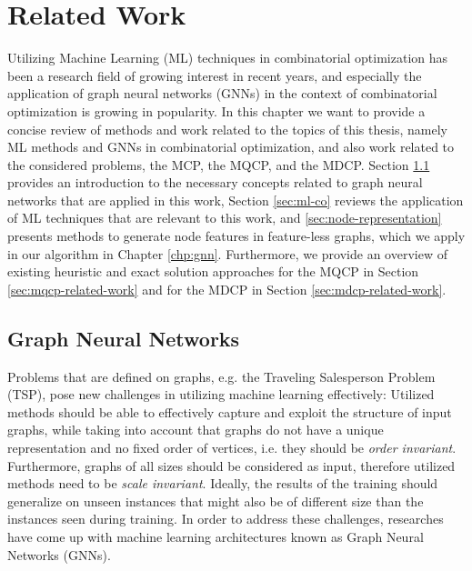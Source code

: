 \documentclass[draft,final]{vutinfth} %
\newtheorem{definition}{Definition}[section]
\begin{document}




\chapter{Related Work}\label{chp:related-work}

Utilizing Machine Learning (ML) techniques in combinatorial optimization has been a research field of growing interest in recent years, and especially the application of graph neural networks (GNNs) in the context of combinatorial optimization is growing in popularity. 
In this chapter we want to provide a concise review of methods and work related to the topics of this thesis, namely ML methods and GNNs in combinatorial optimization, and also work related to the considered problems, the MCP, the MQCP, and the MDCP. Section \ref{sec:gnns} provides an introduction to the necessary concepts related to graph neural networks that are applied in this work, Section \ref{sec:ml-co} reviews the application of ML techniques that are relevant to this work, and \ref{sec:node-representation} presents methods to generate node features in feature-less graphs, which we apply in our algorithm in Chapter \ref{chp:gnn}. Furthermore, we provide an overview of existing heuristic and exact solution approaches for the MQCP in Section \ref{sec:mqcp-related-work} and for the MDCP in Section \ref{sec:mdcp-related-work}. 

\section{Graph Neural Networks}\label{sec:gnns}
Problems that are defined on graphs, e.g. the Traveling Salesperson Problem (TSP), pose new challenges in utilizing machine learning effectively: Utilized methods should be able to effectively capture and exploit the structure of input graphs, while taking into account that graphs do not have a unique representation and no fixed order of vertices, i.e. they should be \emph{order invariant}. Furthermore, graphs of all sizes should be considered as input, therefore utilized methods need to be \emph{scale invariant}. Ideally, the results of the training should generalize on unseen instances that might also be of different size than the instances seen during training. In order to address these challenges, researches have come up with machine learning architectures known as Graph Neural Networks (GNNs). 
\end{document}
